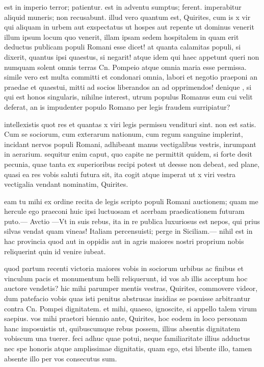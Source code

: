  est in imperio terror; patientur. est in adventu sumptus; ferent. imperabitur aliquid muneris; non recusabunt. illud vero quantum est, Quirites, cum is x vir qui aliquam in urbem aut exspectatus ut hospes aut repente ut dominus venerit illum ipsum locum quo venerit, illam ipsam sedem hospitalem in quam erit deductus publicam populi Romani esse dicet! at quanta calamitas populi, si dixerit, quantus ipsi quaestus, si negarit! atque idem qui haec appetunt queri non numquam solent omnis terras Cn. Pompeio atque omnia maria esse permissa. simile vero est multa committi et condonari omnia, labori et negotio praeponi an praedae et quaestui, mitti ad socios liberandos an ad opprimendos! denique , si qui est honos singularis, nihilne interest, utrum populus Romanus eum cui velit deferat, an is impudenter populo Romano per legis fraudem surripiatur?

 intellexistis quot res et quantas x viri legis permissu vendituri sint. non est satis. Cum se sociorum, cum exterarum nationum, cum regum sanguine implerint, incidant nervos populi Romani, adhibeant manus vectigalibus vestris, inrumpant in aerarium. sequitur enim caput, quo capite ne permittit quidem, si forte desit pecunia, quae tanta ex superioribus recipi potest ut deesse non debeat, sed plane, quasi ea res vobis saluti futura sit, ita cogit atque imperat ut x viri vestra vectigalia vendant nominatim, Quirites.

 eam tu mihi ex ordine recita de legis scripto populi Romani auctionem; quam me hercule ego praeconi huic ipsi luctuosam et acerbam praedicationem futuram puto.— Avctio —Vt in suis rebus, ita in re publica luxuriosus est nepos, qui prius silvas vendat quam vineas! Italiam percensuisti; perge in Siciliam.— nihil est in hac provincia quod aut in oppidis aut in agris maiores nostri proprium nobis reliquerint quin id venire iubeat.

 quod partum recenti victoria maiores vobis in sociorum urbibus ac finibus et vinculum pacis et monumentum belli reliquerunt, id vos ab illis acceptum hoc auctore vendetis? hic mihi parumper mentis vestras, Quirites, commovere videor, dum patefacio vobis quas isti penitus abstrusas insidias se posuisse arbitrantur contra Cn. Pompei dignitatem. et mihi, quaeso, ignoscite, si appello talem virum saepius. vos mihi praetori biennio ante, Quirites, hoc eodem in loco personam hanc imposuistis ut, quibuscumque rebus possem, illius absentis dignitatem vobiscum una tuerer. feci adhuc quae potui, neque familiaritate illius adductus nec spe honoris atque amplissimae dignitatis, quam ego, etsi libente illo, tamen absente illo per vos consecutus sum.

